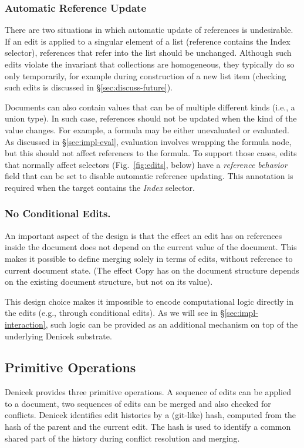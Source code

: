 \documentclass[sigconf,anonymous,screen]{acmart}
\newcommand{\ident}[1]{{\sffamily #1}}
\begin{document}
\subsubsection*{Automatic Reference Update}
There are two situations in which automatic update of references is undesirable. If an edit is
applied to a singular element of a list (reference contains the \ident{Index} selector),
references that refer into the list should be unchanged. Although such edits violate the invariant
that collections are homogeneous, they typically do so only temporarily, for example during
construction of a new list item (checking such edits is discussed in \S\ref{sec:discuss-future}).

Documents can also contain values that can be of multiple different kinds (i.e., a union type).
In such case, references should not be updated when the kind of the value changes. For example,
a formula may be either unevaluated or evaluated. As discussed in \S\ref{sec:impl-eval}, evaluation
involves wrapping the formula node, but this should not affect references to the formula.
To support those cases, edits that normally affect selectors (Fig.~\ref{fig:edits}, below)
have a \emph{reference behavior} field that can be set to disable automatic reference
updating. This annotation is required when the target contains the \emph{Index} selector.

\subsubsection*{No Conditional Edits.}
An important aspect of the design is that the effect an edit has on references inside
the document does not depend on the current value of the document. This makes it possible to
define merging solely in terms of edits, without reference to current document state.
(The effect \ident{Copy} has on the document structure depends on the existing document
structure, but not on its value).

This design choice makes it impossible to encode computational logic directly in the edits
(e.g., through conditional edits). As we will see in \S\ref{sec:impl-interaction}, such logic
can be provided as an additional mechanism on top of the underlying Denicek substrate.


\subsection{Primitive Operations}
\label{sec:system-ops}
Denicek provides three primitive operations. A sequence of edits can be applied to a document, two
sequences of edits can be merged and also checked for conflicts. Denicek identifies edit histories by
a (git-like) hash, computed from the hash of the parent and the current edit. The hash is used to
identify a common shared part of the history during conflict resolution and merging.
\end{document}
